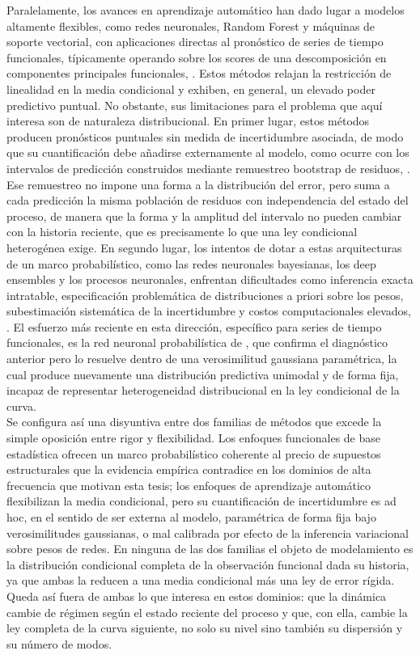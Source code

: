 Paralelamente, los avances en aprendizaje automático han dado lugar a modelos altamente flexibles, como redes neuronales, Random Forest y máquinas de soporte vectorial, con aplicaciones directas al pronóstico de series de tiempo funcionales, típicamente operando sobre los scores de una descomposición en componentes principales funcionales, \cite{03_00_forecast4010022}. Estos métodos relajan la restricción de linealidad en la media condicional y exhiben, en general, un elevado poder predictivo puntual. No obstante, sus limitaciones para el problema que aquí interesa son de naturaleza distribucional. En primer lugar, estos métodos producen pronósticos puntuales sin medida de incertidumbre asociada, de modo que su cuantificación debe añadirse externamente al modelo, como ocurre con los intervalos de predicción construidos mediante remuestreo bootstrap de residuos, \cite{03_00_forecast4010022}. Ese remuestreo no impone una forma a la distribución del error, pero suma a cada predicción la misma población de residuos con independencia del estado del proceso, de manera que la forma y la amplitud del intervalo no pueden cambiar con la historia reciente, que es precisamente lo que una ley condicional heterogénea exige. En segundo lugar, los intentos de dotar a estas arquitecturas de un marco probabilístico, como las redes neuronales bayesianas, los deep ensembles y los procesos neuronales, enfrentan dificultades como inferencia exacta intratable, especificación problemática de distribuciones a priori sobre los pesos, subestimación sistemática de la incertidumbre y costos computacionales elevados, \cite{03_00_kamarthi2021doubt}. El esfuerzo más reciente en esta dirección, específico para series de tiempo funcionales, es la red neuronal probabilística de \citet{03_00_wang2025profnet}, que confirma el diagnóstico anterior pero lo resuelve dentro de una verosimilitud gaussiana paramétrica, la cual produce nuevamente una distribución predictiva unimodal y de forma fija, incapaz de representar heterogeneidad distribucional en la ley condicional de la curva.\\
 
Se configura así una disyuntiva entre dos familias de métodos que excede la simple oposición entre rigor y flexibilidad. Los enfoques funcionales de base estadística ofrecen un marco probabilístico coherente al precio de supuestos estructurales que la evidencia empírica contradice en los dominios de alta frecuencia que motivan esta tesis; los enfoques de aprendizaje automático flexibilizan la media condicional, pero su cuantificación de incertidumbre es ad hoc, en el sentido de ser externa al modelo, paramétrica de forma fija bajo verosimilitudes gaussianas, o mal calibrada por efecto de la inferencia variacional sobre pesos de redes. En ninguna de las dos familias el objeto de modelamiento es la distribución condicional completa de la observación funcional dada su historia, ya que ambas la reducen a una media condicional más una ley de error rígida. Queda así fuera de ambas lo que interesa en estos dominios: que la dinámica cambie de régimen según el estado reciente del proceso y que, con ella, cambie la ley completa de la curva siguiente, no solo su nivel sino también su dispersión y su número de modos.
 
